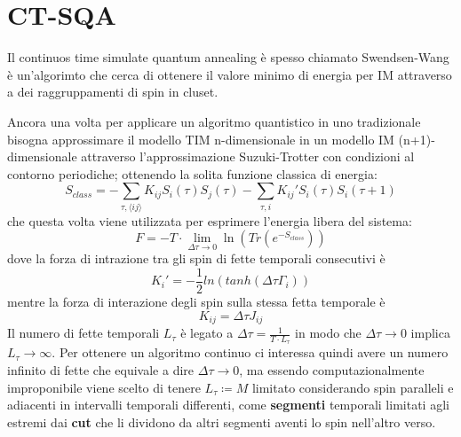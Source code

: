 \section{CT-SQA}
Il continuos time simulate quantum annealing è spesso chiamato Swendsen-Wang è un'algorimto che cerca di ottenere il valore minimo di energia per IM attraverso a dei raggruppamenti di spin in cluset.

Ancora una volta per applicare un algoritmo quantistico in uno tradizionale bisogna approssimare il modello TIM n-dimensionale in un modello IM (n+1)-dimensionale attraverso l'approssimazione Suzuki-Trotter con condizioni al contorno periodiche; ottenendo la solita funzione classica di energia:
$$S_{class} = - \sum_{\tau,\langle ij \rangle} K_{ij} S_i(\tau) S_j(\tau) - \sum_{\tau, i} K_{ij}' S_i(\tau) S_i(\tau+1)$$
che questa volta viene utilizzata per esprimere l'energia libera del sistema:
$$F = - T \cdot \lim_{\Delta \tau \to 0} \ln(Tr(e^{-S_{class}}))$$
dove la forza di intrazione tra gli spin di fette temporali consecutivi è
$$K_{i}' = - \frac{1}{2} ln( tanh( \Delta \tau \Gamma_i) )$$
mentre la forza di interazione degli spin sulla stessa fetta temporale è
$$K_{ij} = \Delta \tau J_{ij}$$
Il numero di fette temporali $L_{\tau}$ è legato a $\Delta \tau = \frac{1}{T \cdot L_{\tau}}$ in modo che $\Delta \tau \to 0$ implica $L_{\tau} \to \infty$.
Per ottenere un algoritmo continuo ci interessa quindi avere un numero infinito di fette che equivale a dire $\Delta \tau \to 0$, ma essendo computazionalmente improponibile viene scelto di tenere $L_{\tau} \coloneqq M$ limitato considerando spin paralleli e adiacenti in intervalli temporali differenti, come \textbf{segmenti} temporali limitati agli estremi dai \textbf{cut} che li dividono da altri segmenti aventi lo spin nell'altro verso.

